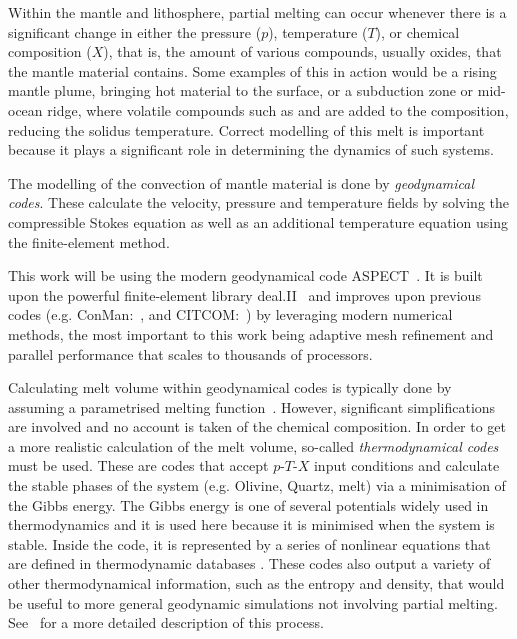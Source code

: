 Within the mantle and lithosphere, partial melting can occur whenever there is a significant change in either the pressure ($p$), temperature ($T$), or chemical composition ($X$), that is, the amount of various compounds, usually oxides, that the mantle material contains.
Some examples of this in action would be a rising mantle plume, bringing hot material to the surface, or a subduction zone or mid-ocean ridge, where volatile compounds such as  and  are added to the composition, reducing the solidus temperature.
Correct modelling of this melt is important because it plays a significant role in determining the dynamics of such systems.

\vspace{5mm}

The modelling of the convection of mantle material is done by \textit{geodynamical codes}.
These calculate the velocity, pressure and temperature fields by solving the compressible Stokes equation as well as an additional temperature equation using the finite-element method.

This work will be using the modern geodynamical code ASPECT~\parencite{kronbichlerHighAccuracyMantle2012}.
It is built upon the powerful finite-element library deal.II~\parencite{bangerth_dealiigeneral-purpose_2007} and improves upon previous codes (e.g. ConMan:~\cite{king_conman_1990}, and CITCOM:~\cite{moresi_accuracy_1996}) by leveraging modern numerical methods, the most important to this work being adaptive mesh refinement and parallel performance that scales to thousands of processors.

\vspace{5mm}

Calculating melt volume within geodynamical codes is typically done by assuming a parametrised melting function~\parencite[e.g.][]{dannbergCompressibleMagmaMantle2016, katz_new_2003}.
However, significant simplifications are involved and no account is taken of the chemical composition.
In order to get a more realistic calculation of the melt volume, so-called \textit{thermodynamical codes} must be used.
These are codes that accept $p$-$T$-$X$ input conditions and calculate the stable phases of the system (e.g. Olivine, Quartz, melt) via a minimisation of the Gibbs energy.
The Gibbs energy is one of several potentials widely used in thermodynamics and it is used here because it is minimised when the system is stable.
Inside the code, it is represented by a series of nonlinear equations that are defined in thermodynamic databases \parencite[e.g.][]{hollandMeltingPeridotitesGranites2018}.
These codes also output a variety of other thermodynamical information, such as the entropy and density, that would be useful to more general geodynamic simulations not involving partial melting.
See~\textcite{connollyPrimerGibbsEnergy2017} for a more detailed description of this process.

